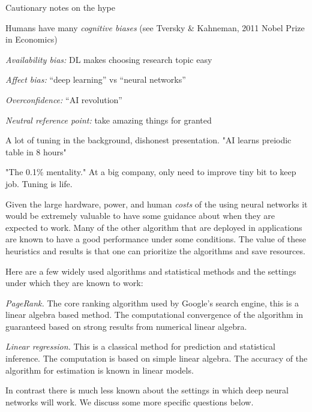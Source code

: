 \documentclass[english]{article}
\begin{document}
\item Cautionary notes on the hype

\bitem
\item Humans have many \emph{cognitive biases} (see Tversky \& Kahneman, 2011 Nobel Prize in Economics)
\item \emph{Availability bias:} DL makes choosing research topic easy
\item \emph{Affect bias:} ``deep learning'' vs ``neural networks'' %
\item \emph{Overconfidence:} ``AI revolution''
\item \emph{Neutral reference point:} take amazing things for granted
\item A lot of tuning in the background, dishonest presentation. "AI learns preiodic table in 8 hours"

"The 0.1\% mentality." At a big company, only need to improve tiny bit to keep job. Tuning is life. 
\eitem

\item 
Given the large hardware, power, and human \emph{costs} of the using neural networks it would be extremely valuable to have some guidance about when they are expected to work.  Many of the other algorithm that are deployed in applications are known to have a good performance under some  conditions. The value of these heuristics and results is that one can prioritize the algorithms and  save resources. 

Here are  a few widely used algorithms and statistical methods and the settings under which they are known to work: 

\benum
\item \emph{PageRank.} The core ranking algorithm used by Google's search engine, this is a linear algebra based method. The computational  convergence of the algorithm in guaranteed based on  strong results from numerical linear algebra. 

\item \emph{Linear regression.} This is a classical method for  prediction and statistical inference. The computation is based on simple linear algebra. The accuracy of the algorithm  for estimation is known in linear models. 

\eenum

In contrast there is much less known about the settings in which deep neural networks will work. We discuss some more specific questions below. 
\end{document}
